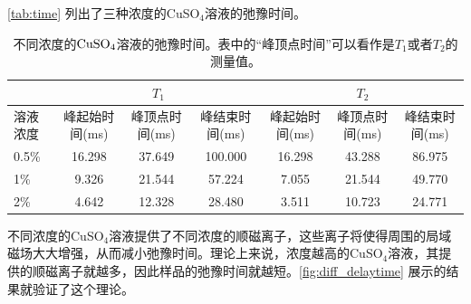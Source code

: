 \documentclass[font=default]{mpltx}
\begin{document}
\autoref{tab:time} 列出了三种浓度的CuSO$_4$溶液的弛豫时间。
\begin{table}[]
    \centering
    \caption{不同浓度的${\rm CuSO_4}$溶液的弛豫时间。表中的“峰顶点时间”可以看作是$T_1$或者$T_2$的测量值。}
    \label{tab:time}
    \begin{tabular}{l|ccc|ccc}
      \hline\hline
      & \multicolumn{3}{c|}{$T_1$}&\multicolumn{3}{c}{$T_2$}\\\hline
      溶液浓度& 峰起始时间(ms)  & 峰顶点时间(ms)  & 峰结束时间(ms)   & 峰起始时间(ms)  & 峰顶点时间(ms)  & 峰结束时间(ms)  \\
    0.5\%  & 16.298 & 37.649 & 100.000 & 16.298 & 43.288 & 86.975 \\
    1\%    & 9.326  & 21.544 & 57.224  & 7.055  & 21.544 & 49.770  \\
    2\%    & 4.642  & 12.328 & 28.480  & 3.511  & 10.723 & 24.771 \\\hline\hline
    \end{tabular}
\end{table}
不同浓度的CuSO$_4$溶液提供了不同浓度的顺磁离子，这些离子将使得周围的局域磁场大大增强，从而减小弛豫时间。理论上来说，浓度越高的CuSO$_4$溶液，其提供的顺磁离子就越多，因此样品的弛豫时间就越短。\autoref{fig:diff_delaytime} 展示的结果就验证了这个理论。
\end{document}
